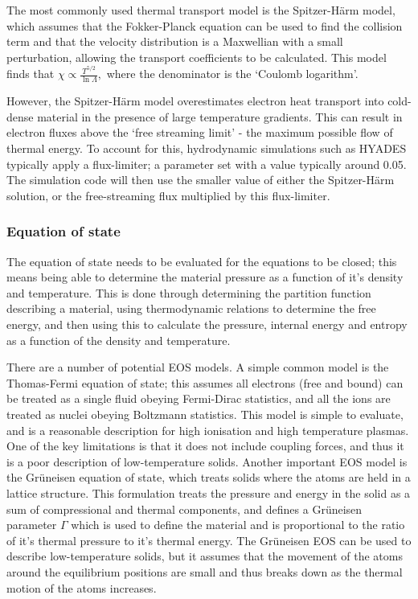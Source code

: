 The most commonly used thermal transport model is the Spitzer-H{\"a}rm model, which assumes that the Fokker-Planck equation can be used to find the collision term and that the velocity distribution is a Maxwellian with a small perturbation, allowing the transport coefficients to be calculated. This model finds that $\chi \propto \frac{T^{5/2}}{\ln{\Lambda}},$ where the denominator is the `Coulomb logarithm'.

However, the Spitzer-H{\"a}rm model overestimates electron heat transport into cold-dense material in the presence of large temperature gradients. This can result in electron fluxes above the `free streaming limit'  - the maximum possible flow of thermal energy. To account for this, hydrodynamic simulations such as HYADES typically apply a flux-limiter; a parameter set with a value typically around 0.05. The simulation code will then use the smaller value of either the Spitzer-H{\"a}rm solution, or the free-streaming flux multiplied by this flux-limiter. 

\subsubsection{Equation of state}
The equation of state needs to be evaluated for the equations to be closed; this means being able to determine the material pressure as a function of it's density and temperature. This is done through determining the partition function describing a material, using thermodynamic relations to determine the free energy, and then using this to calculate the pressure, internal energy and entropy as a function of the density and temperature.

There are a number of potential EOS models. A simple common model is the Thomas-Fermi equation of state; this assumes all electrons (free and bound) can be treated as a single fluid obeying Fermi-Dirac statistics, and all the ions are treated as nuclei obeying Boltzmann statistics. This model is simple to evaluate, and is a reasonable description for high ionisation and high temperature plasmas. One of the key limitations is that it does not include coupling forces, and thus it is a poor description of low-temperature solids. Another important EOS model is the Gr{\"u}neisen equation of state, which treats solids where the atoms are held in a lattice structure. This formulation treats the pressure and energy in the solid as a sum of compressional and thermal components, and defines a Gr{\"u}neisen parameter $\Gamma$ which is used to define the material and is proportional to the ratio of it's thermal pressure to it's thermal energy. The Gr{\"u}neisen EOS can be used to describe low-temperature solids, but it assumes that the movement of the atoms around the equilibrium positions are small and thus breaks down as the thermal motion of the atoms increases.

